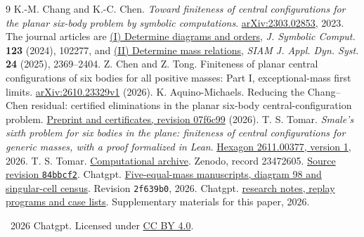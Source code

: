 \documentclass[11pt]{article}
\newcommand{\supplement}{\href{https://github.com/rongyulin/physics-open-problems-AI/tree/main/problems/planar-central-configurations/notes/reduction}{research notes, replay programs and case lists}}
\begin{document}
\begin{thebibliography}{9}\small\setlength{\itemsep}{1pt}
 K.-M. Chang and K.-C. Chen. \emph{Toward finiteness of central configurations for the planar six-body problem by symbolic computations}. \href{https://arxiv.org/abs/2303.02853}{arXiv:2303.02853}, 2023. The journal articles are \href{https://doi.org/10.1016/j.jsc.2023.102277}{(I) Determine diagrams and orders}, \emph{J. Symbolic Comput.} \textbf{123} (2024), 102277, and \href{https://doi.org/10.1137/24M1716070}{(II) Determine mass relations}, \emph{SIAM J. Appl. Dyn. Syst.} \textbf{24} (2025), 2369--2404.
 Z. Chen and Z. Tong. Finiteness of planar central configurations of six bodies for all positive masses: Part I, exceptional-mass first limits. \href{https://arxiv.org/abs/2610.23329v1}{arXiv:2610.23329v1} (2026).
 K. Aquino-Michaels. Reducing the Chang--Chen residual: certified eliminations in the planar six-body central-configuration problem. \href{https://github.com/no-way-labs/smale6-residual/tree/07f6c99}{Preprint and certificates, revision 07f6c99} (2026).
 T. S. Tomar. \emph{Smale's sixth problem for six bodies in the plane: finiteness of central configurations for generic masses, with a proof formalized in Lean}. \href{https://hexagonmath.org/pdf/2611.00377v1}{Hexagon 2611.00377, version 1}, 2026.
 T. S. Tomar. \href{https://doi.org/10.5281/zenodo.23472605}{Computational archive}. Zenodo, record 23472605. \href{https://github.com/tejasvi/smale6-six-bodies-generic/tree/84bbcf276d029fdf31375c4a21c6a7e136955e51}{Source revision \texttt{84bbcf2}}.
 Chatgpt. \href{https://github.com/rongyulin/physics-open-problems-AI/tree/2f639b089053cf17fc6fce7274c06991119621ef/problems/planar-central-configurations}{Five-equal-mass manuscripts, diagram 98 and singular-cell census}. Revision \texttt{2f639b0}, 2026.
 Chatgpt. \supplement. Supplementary materials for this paper, 2026.
\end{thebibliography}
\noindent\small\textcopyright\ 2026 Chatgpt. Licensed under \href{https://creativecommons.org/licenses/by/4.0/}{CC BY 4.0}.
\end{document}
